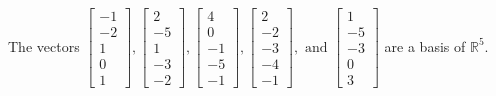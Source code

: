 \begin{exercise}
\begin{exerciseStatement}
  \end{exerciseStatement}
  \begin{exerciseAnswer}
   The vectors \(\left[\begin{array}{r}
-1 \\
-2 \\
1 \\
0 \\
1
\end{array}\right] , \left[\begin{array}{r}
2 \\
-5 \\
1 \\
-3 \\
-2
\end{array}\right] , \left[\begin{array}{r}
4 \\
0 \\
-1 \\
-5 \\
-1
\end{array}\right] , \left[\begin{array}{r}
2 \\
-2 \\
-3 \\
-4 \\
-1
\end{array}\right] , \text{ and } \left[\begin{array}{r}
1 \\
-5 \\
-3 \\
0 \\
3
\end{array}\right]\) 
  	 are  a basis of \(\mathbb{R}^5\).
  


  \end{exerciseAnswer}
\end{exercise}